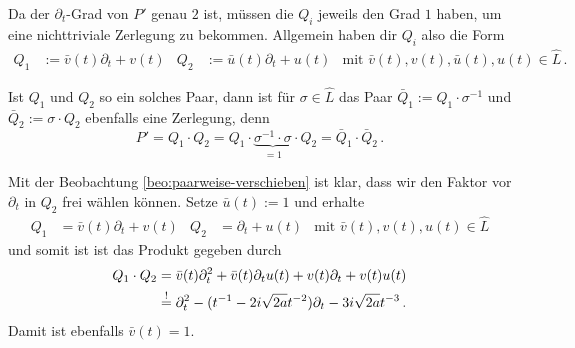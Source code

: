 Da der $\partial_t$-Grad von $P'$ genau $2$ ist, müssen die $Q_i$
jeweils den Grad $1$ haben, um eine nichttriviale Zerlegung zu bekommen.
Allgemein haben dir $Q_i$ also die Form
\begin{align*}
Q_1&:=\bar v(t) \partial_t + v(t) & Q_2&:=\bar u(t)\partial_t + u(t)
& \mbox{mit } \bar v(t), v(t), \bar u(t), u(t)\in \hat L \,.
\end{align*}
\begin{beo} \label{beo:paarweise-verschieben}
Ist $Q_1$ und $Q_2$ so ein solches Paar, dann ist für $\sigma\in \hat L$ das
Paar $\bar Q_1:=Q_1\cdot \sigma^{-1}$ und $\bar Q_2:=\sigma\cdot Q_2$ ebenfalls
eine Zerlegung, denn
\[
P'=Q_1\cdot Q_2= Q_1\cdot
\underset{=1}{\underbrace{
  \sigma^{-1} \cdot \sigma
}}
\cdot Q_2 =\bar Q_1 \cdot \bar Q_2 \,.
\]
\end{beo}
Mit der Beobachtung \ref{beo:paarweise-verschieben} ist klar, dass wir den
Faktor vor $\partial_t$ in $Q_2$ frei wählen können. Setze $\bar u(t):=1$ und
erhalte
\begin{align*}
Q_1&=\bar v(t) \partial_t + v(t) & Q_2&=\partial_t + u(t)
& \mbox{mit } \bar v(t), v(t), u(t)\in \hat L
\end{align*}
und somit ist ist das Produkt gegeben durch
\begin{align} \label{eq:schritt100}
Q_1\cdot Q_2&=\bar v(t) \partial_t^2 + \bar v(t)\partial_t u(t) +
  v(t)\partial_t + v(t)u(t)
\notag\\&\overset{!}{=} \partial_t^2 - (t^{-1} - 2i\sqrt{2a}t^{-2})\partial_t
  - 3 i\sqrt{2a}t^{-3} \,.
\end{align}
Damit ist ebenfalls $\bar v(t)=1$.

